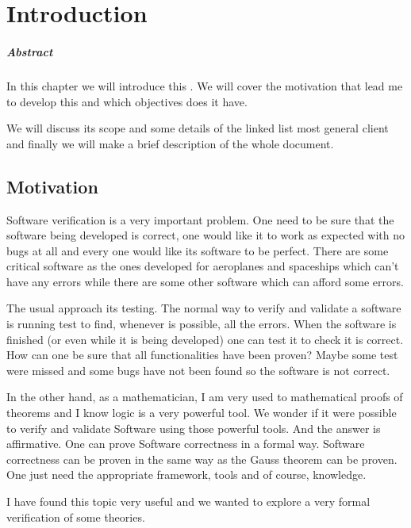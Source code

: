 \chapter{Introduction\label{chap:introduction}}

\paragraph{Abstract}

In this chapter we will introduce this \thisworkm. We will cover the motivation that lead me to develop this \thisworkm and which objectives does it have.

We will discuss its scope and some details of the linked list most general client and finally we will make a brief description of the whole document. 

\section{Motivation}

Software verification is a very important problem.
One need to be sure that the software being developed is correct, one would like it to work as expected with no bugs at all and every one would like its software to be perfect.
There are some critical software as the ones developed for aeroplanes and spaceships which can't have any errors while there are some other software which can afford some errors.

The usual approach its testing. The normal way to verify and validate a software is running test to find, whenever is possible, all the errors. 
When the software is finished (or even while it is being developed) one can test it to check it is correct.
How can one be sure that all functionalities have been proven? Maybe some test were missed and some bugs have not been found so the software is not correct.


In the other hand, as a mathematician, I am very used to mathematical proofs of theorems and I know logic is a very powerful tool.
We wonder if it were possible to verify and validate Software using those powerful tools.
And the answer is affirmative.
One can prove Software correctness in a formal way. Software correctness can be proven in the same way as the Gauss theorem can be proven.
One just need the appropriate framework, tools and of course, knowledge.

I have found this topic very useful and we wanted to explore a very formal verification of some theories.

